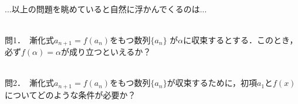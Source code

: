 \documentclass[10pt,
b5paper,
fleqn,
dvipdfmx,
uplatex
]{jsarticle}
\newtheorem{Q}{}[subsection]
\newtheorem{question}[Question]{}
\newcommand{\sub}{\newpage\ \vspace{-4zw}\subsection}
\newcommand{\bqu}{\begin{question}}
\newcommand{\equ}{\end{question}}
\newcommand{\bQ}{\begin{Q}}
\newcommand{\eQ}{\end{Q}}
\newcommand{\mondaisettei}{\kaisetufalse
\renewcommand{\sub}{\subsection}
\renewcommand{\bqu}{\vspace{0.5zw}\begin{question}}
\renewcommand{\equ}{\end{question}\vspace{3zw}}
\renewcommand{\bQ}{\vspace{0.5zw}\begin{Q}}
\renewcommand{\eQ}{\end{Q}\vspace{3zw}}
}%
\newcommand{\kaisetutukinosettei}{\kaisetutrue
\renewcommand{\sub}{\newpage\ \vspace{-4zw}\subsection}
\renewcommand{\bqu}{\begin{mybox}\begin{question}}
\renewcommand{\equ}{\end{question}\end{mybox}}
\renewcommand{\bQ}{\begin{mybox}\begin{Q}}
\renewcommand{\eQ}{\end{Q}\end{mybox}}
}%
\newif\ifkaisetu
\newcommand{\mondaitokaitou}{
\mondaisettei
\myfor{1} %
\newpage   
\setcounter{subsection}{0}
\setcounter{Question}{0}
\setcounter{Q}{0}
\kaisetutukinosettei
\myfor{1} %
}
\begin{document}
{\newpage

\ \\

\vfill

...以上の問題を眺めていると自然に浮かんでくるのは...

\ \\

問1．\ 漸化式$a_{n+1}=f(a_n)$をもつ数列$\{a_n\}$
が$\alpha$に収束するとする．このとき，必ず$f(\alpha)=\alpha$が成り立つといえるか？

\ \\

問2．\ 漸化式$a_{n+1}=f(a_n)$をもつ数列$\{a_n\}$が収束するために，初項$a_1$と$f(x)$についてどのような条件が必要か？


\ \\

\fi

\iffuru
}\mondaitokaitou
\fi                                                                 
\end{document}
